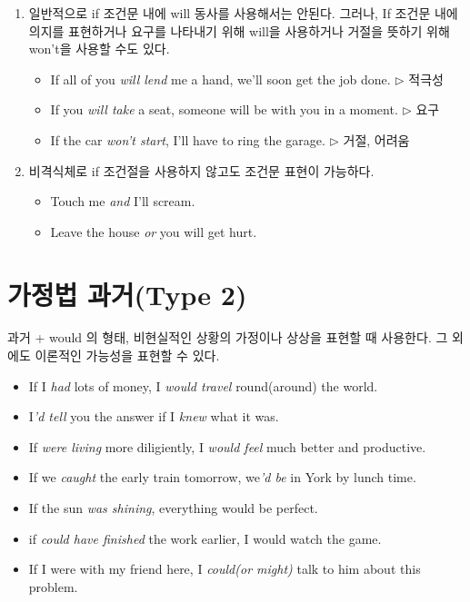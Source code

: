 \documentclass[ a4paper]{oblivoir}
\begin{document}
\begin{itemize}
{\begin{enumerate}
            \item 일반적으로 if 조건문 내에 will 동사를 사용해서는 안된다. 그러나, If 조건문 내에 의지를 표현하거나 요구를 나타내기 위해 will을 사용하거나 거절을 뜻하기 위해 won't을 사용할 수도 있다. 
            \begin{itemize}
                \item If all of you \emph{will lend} me a hand, we'll soon get the job done. $\triangleright$ 적극성
                \item If you \emph{will take} a seat, someone will be with you in a moment. $\triangleright$ 요구
                \item If the car \emph{won't start}, I'll have to ring the garage. $\triangleright$ 거절, 어려움
            \end{itemize}
            \item  비격식체로 if 조건절을 사용하지 않고도 조건문 표현이 가능하다.
            \begin{itemize}
                \item Touch me \emph{and} I'll scream.
                \item Leave the house \emph{or} you will get hurt.
            \end{itemize}
        \end{enumerate}}
    \end{itemize}
    \section{가정법 과거(Type 2)}

    과거 + would 의 형태, 비현실적인 상황의 가정이나 상상을 표현할 때 사용한다. 그 외에도 이론적인 가능성을 표현할 수 있다. 
    \begin{itemize}[label = {--}]
        \item If I \emph{had} lots of money, I \emph{would travel} round(around) the world.
        \item I\emph{'d tell} you the answer if I \emph{knew} what it was. 
        \item If \emph{were living} more diligiently, I \emph{would feel} much better and productive.
        \item If we \emph{caught} the early train tomorrow, we\emph{'d be} in York by lunch time.
        \item If the sun \emph{was shining}, everything would be perfect.
        \item if \emph{could have finished} the work earlier, I would watch the game.
        \item If I were with my friend here, I \emph{could(or might)} talk to him about this problem.
    
    \end{itemize}
\end{document}
